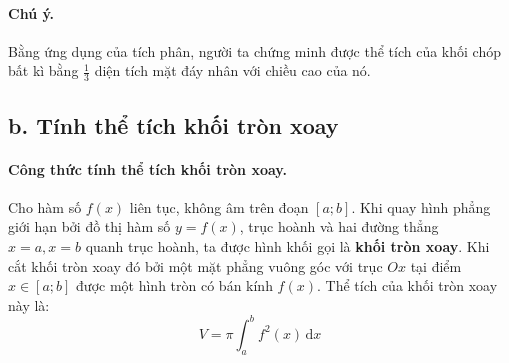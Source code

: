 \begin{center}
\end{center}

\paragraph{Chú ý.} Bằng ứng dụng của tích phân, người ta chứng minh được thể tích của khối chóp bất kì bằng $\frac{1}{3}$ diện tích mặt đáy nhân với chiều cao của nó.

\vspace{0.5cm}

\subsection*{b. Tính thể tích khối tròn xoay}

\paragraph{Công thức tính thể tích khối tròn xoay.} 
Cho hàm số $f(x)$ liên tục, không âm trên đoạn $[a; b]$. 
Khi quay hình phẳng giới hạn bởi đồ thị hàm số $y = f(x)$, trục hoành và hai đường thẳng $x = a, x = b$ quanh trục hoành, ta được hình khối gọi là \textbf{khối tròn xoay}. 
Khi cắt khối tròn xoay đó bởi một mặt phẳng vuông góc với trục $Ox$ tại điểm $x \in [a; b]$ được một hình tròn có bán kính $f(x)$. Thể tích của khối tròn xoay này là:
\[
V = \pi \int_{a}^{b} f^2(x) \, \mathrm{d}x
\]


